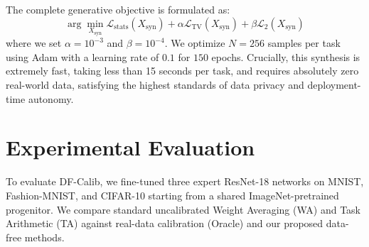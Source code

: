 \documentclass{article}
\theoremstyle{plain}
\theoremstyle{definition}
\theoremstyle{remark}
\begin{document}
The complete generative objective is formulated as:
\begin{equation}
  \arg\min_{X_{\text{syn}}} \mathcal{L}_{\text{stats}}(X_{\text{syn}}) + \alpha \mathcal{L}_{\text{TV}}(X_{\text{syn}}) + \beta \mathcal{L}_2(X_{\text{syn}})
\end{equation}
where we set $\alpha = 10^{-3}$ and $\beta = 10^{-4}$. We optimize $N = 256$ samples per task using Adam with a learning rate of $0.1$ for $150$ epochs. Crucially, this synthesis is extremely fast, taking less than 15 seconds per task, and requires absolutely zero real-world data, satisfying the highest standards of data privacy and deployment-time autonomy.

\section{Experimental Evaluation}
To evaluate DF-Calib, we fine-tuned three expert ResNet-18 networks on MNIST, Fashion-MNIST, and CIFAR-10 starting from a shared ImageNet-pretrained progenitor. We compare standard uncalibrated Weight Averaging (WA) and Task Arithmetic (TA) against real-data calibration (Oracle) and our proposed data-free methods.
\end{document}
